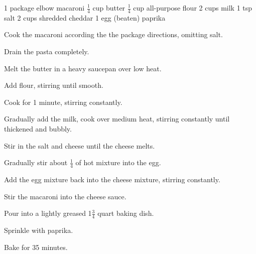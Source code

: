 \dishtype{}
\begin{ingreds}
    1 package elbow macaroni
    $\frac{1}{4}$ cup butter
    $\frac{1}{4}$ cup all-purpose flour
    2 cups milk
    1 tsp salt
    2 cups shredded cheddar
    1 egg (beaten)
    paprika
\end{ingreds}
\begin{method}
    Cook the macaroni according the the package directions, omitting salt.\par
    Drain the pasta completely.\par
    Melt the butter in a heavy saucepan over low heat.\par
    Add flour, stirring until smooth.\par
    Cook for 1 minute, stirring constantly.\par
    Gradually add the milk, cook over medium heat, stirring constantly until thickened and bubbly.\par
    Stir in the salt and cheese until the cheese melts.\par
    Gradually stir about $\frac{1}{4}$ of hot mixture into the egg.\par
    Add the egg mixture back into the cheese mixture, stirring constantly.\par
    Stir the macaroni into the cheese sauce.\par
    Pour into a lightly greased 1$\frac{3}{4}$ quart baking dish.\par
    Sprinkle with paprika.\par
    Bake for 35 minutes.
\end{method}